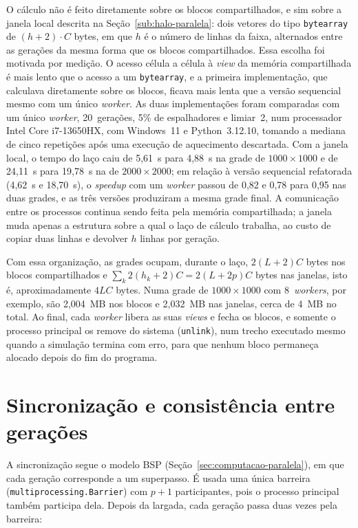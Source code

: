 O cálculo não é feito diretamente sobre os blocos compartilhados, e sim sobre a janela local descrita na Seção~\ref{sub:halo-paralela}: dois vetores do tipo \texttt{bytearray} de $(h+2) \cdot C$ bytes, em que $h$ é o número de linhas da faixa, alternados entre as gerações da mesma forma que os blocos compartilhados. Essa escolha foi motivada por medição. O acesso célula a célula à \textit{view} da memória compartilhada é mais lento que o acesso a um \texttt{bytearray}, e a primeira implementação, que calculava diretamente sobre os blocos, ficava mais lenta que a versão sequencial mesmo com um único \textit{worker}. As duas implementações foram comparadas com um único \textit{worker}, 20~gerações, 5\% de espalhadores e limiar~2, num processador Intel Core i7-13650HX, com Windows~11 e Python~3.12.10, tomando a mediana de cinco repetições após uma execução de aquecimento descartada. Com a janela local, o tempo do laço caiu de 5,61~s para 4,88~s na grade de $1000 \times 1000$ e de 24,11~s para 19,78~s na de $2000 \times 2000$; em relação à versão sequencial refatorada (4,62~s e 18,70~s), o \textit{speedup} com um \textit{worker} passou de 0,82 e 0,78 para 0,95 nas duas grades, e as três versões produziram a mesma grade final. A comunicação entre os processos continua sendo feita pela memória compartilhada; a janela muda apenas a estrutura sobre a qual o laço de cálculo trabalha, ao custo de copiar duas linhas e devolver $h$ linhas por geração.

Com essa organização, as grades ocupam, durante o laço, $2(L+2)C$ bytes nos blocos compartilhados e $\sum_k 2(h_k+2)C = 2(L+2p)C$ bytes nas janelas, isto é, aproximadamente $4LC$ bytes. Numa grade de $1000 \times 1000$ com 8~\textit{workers}, por exemplo, são 2,004~MB nos blocos e 2,032~MB nas janelas, cerca de 4~MB no total. Ao final, cada \textit{worker} libera as suas \textit{views} e fecha os blocos, e somente o processo principal os remove do sistema (\texttt{unlink}), num trecho executado mesmo quando a simulação termina com erro, para que nenhum bloco permaneça alocado depois do fim do programa.

\section{Sincronização e consistência entre gerações}\label{sec:sincronizacao-paralela}

A sincronização segue o modelo \ac{BSP} (Seção~\ref{sec:computacao-paralela}), em que cada geração corresponde a um superpasso. É usada uma única barreira (\texttt{multiprocessing.Barrier}) com $p+1$ participantes, pois o processo principal também participa dela. Depois da largada, cada geração passa duas vezes pela barreira:

